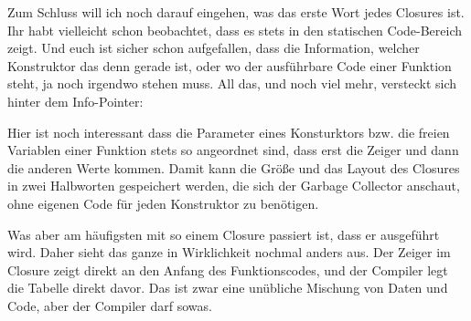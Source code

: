 \documentclass[11pt,DIV=12,parskip=half,headings=normal,abstract]{scrartcl}
\begin{document}
Zum Schluss will ich noch darauf eingehen, was das erste Wort jedes Closures ist. Ihr habt vielleicht schon beobachtet, dass es stets in den statischen Code-Bereich zeigt. Und euch ist sicher schon aufgefallen, dass die Information, welcher Konstruktor das denn gerade ist, oder wo der ausführbare Code einer Funktion steht, ja noch irgendwo stehen muss. All das, und noch viel mehr, versteckt sich hinter dem Info-Pointer:

\def\ux{2.8cm}\def\uy{0.6cm}
\begin{center}
\end{center}

Hier ist noch interessant dass die Parameter eines Konsturktors bzw. die freien Variablen einer Funktion stets so angeordnet sind, dass erst die Zeiger und dann die anderen Werte kommen. Damit kann die Größe und das Layout des Closures in zwei Halbworten gespeichert werden, die sich der Garbage Collector anschaut, ohne eigenen Code für jeden Konstruktor zu benötigen.

Was aber am häufigsten mit so einem Closure passiert ist, dass er ausgeführt wird. Daher sieht das ganze in Wirklichkeit nochmal anders aus. Der Zeiger im Closure zeigt direkt an den Anfang des Funktionscodes, und der Compiler legt die Tabelle direkt davor. Das ist zwar eine unübliche Mischung von Daten und Code, aber der Compiler darf sowas.
\end{document}

